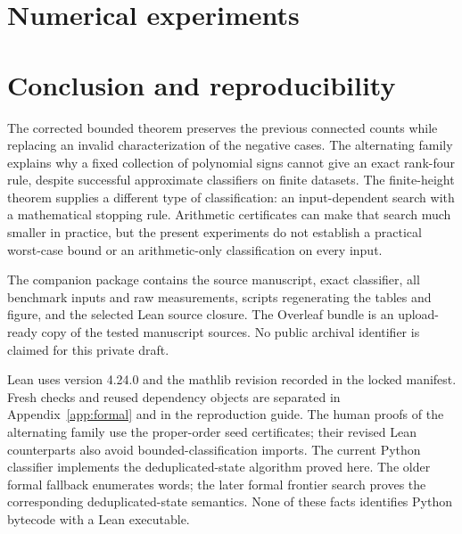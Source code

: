 \documentclass[11pt]{amsart}
\theoremstyle{definition}\newtheorem{definition}[theorem]{Definition}
\theoremstyle{remark}\newtheorem{remark}[theorem]{Remark}
\begin{document}
\section{Numerical experiments}\label{sec:experiments}


\section{Conclusion and reproducibility}\label{sec:conclusion}
The corrected bounded theorem preserves the previous connected counts while replacing an invalid characterization of the negative cases. The alternating family explains why a fixed collection of polynomial signs cannot give an exact rank-four rule, despite successful approximate classifiers on finite datasets. The finite-height theorem supplies a different type of classification: an input-dependent search with a mathematical stopping rule. Arithmetic certificates can make that search much smaller in practice, but the present experiments do not establish a practical worst-case bound or an arithmetic-only classification on every input.

The companion package contains the source manuscript, exact classifier, all benchmark inputs and raw measurements, scripts regenerating the tables and figure, and the selected Lean source closure.  The Overleaf bundle is an upload-ready copy of the tested manuscript sources. No public archival identifier is claimed for this private draft.

Lean uses version 4.24.0 and the mathlib revision recorded in the locked manifest. Fresh checks and reused dependency objects are separated in Appendix~\ref{app:formal} and in the reproduction guide. The human proofs of the alternating family use the proper-order seed certificates; their revised Lean counterparts also avoid bounded-classification imports. The current Python classifier implements the deduplicated-state algorithm proved here. The older formal fallback enumerates words; the later formal frontier search proves the corresponding deduplicated-state semantics. None of these facts identifies Python bytecode with a Lean executable.

\appendix



\end{document}
